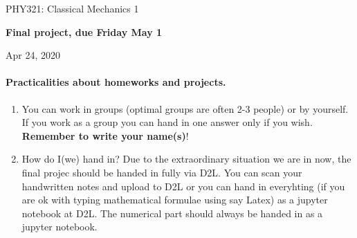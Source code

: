 \documentclass[%
oneside,                 %
final,                   %
10pt]{article}
\begin{document}

\newcommand{\exercisesection}[1]{\subsection*{#1}}






\thispagestyle{empty}

\begin{center}
{\LARGE\bf
\begin{spacing}{1.25}
PHY321: Classical Mechanics 1
\end{spacing}
}
\end{center}


\begin{center}
{\bf Final  project, due Friday May 1${}^{}$} \\ [0mm]
\end{center}

\begin{center}
\end{center}
    

\begin{center}
Apr 24, 2020
\end{center}

\vspace{1cm}


\paragraph{Practicalities about  homeworks and projects.}
\begin{enumerate}
\item You can work in groups (optimal groups are often 2-3 people) or by yourself. If you work as a group you can hand in one answer only if you wish. \textbf{Remember to write your name(s)}!

\item How do I(we)  hand in?  Due to the extraordinary situation we are in now, the final projec should be handed in fully via D2L. You can scan your handwritten notes and upload to D2L or you can hand in everyhting (if you are ok with typing mathematical formulae using say Latex) as a jupyter notebook at D2L. The numerical part should always be handed in as a jupyter notebook.
\end{enumerate}
\end{document}
